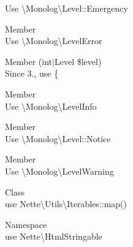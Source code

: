 \begin{DoxyRefList}
\label{deprecated__deprecated000125}%
%
Use \textbackslash{}\+Monolog\textbackslash{}\+Level\+::\+Emergency  
\item[Member \doxylink{class_monolog_1_1_logger_a49efb7c5d80f3d4d1546628ed3d7753e}{Monolog\textbackslash{}Logger\+::ERROR} ]\hfill \\
\label{deprecated__deprecated000122}%
%
Use \textbackslash{}\+Monolog\textbackslash{}\+LevelError  
\item[Member \doxylink{class_monolog_1_1_logger_a9f836823f9dd8789d6d2d80ef84a0a00}{Monolog\textbackslash{}Logger\+::get\+Level\+Name} (int\texorpdfstring{$\vert$}{|}\+Level \$level)]\hfill \\
\label{deprecated__deprecated000126}%
%
Since 3., use \{ 
\item[Member \doxylink{class_monolog_1_1_logger_abc97a22650dfd188c44f4eedd74f90c4}{Monolog\textbackslash{}Logger\+::INFO} ]\hfill \\
\label{deprecated__deprecated000119}%
%
Use \textbackslash{}\+Monolog\textbackslash{}\+LevelInfo  
\item[Member \doxylink{class_monolog_1_1_logger_af42abdf8b3a233980b62cfba1a093bbf}{Monolog\textbackslash{}Logger\+::NOTICE} ]\hfill \\
\label{deprecated__deprecated000120}%
%
Use \textbackslash{}\+Monolog\textbackslash{}\+Level\+::\+Notice  
\item[Member \doxylink{class_monolog_1_1_logger_aa7f7b657ebaef94d93c93ff472556431}{Monolog\textbackslash{}Logger\+::WARNING} ]\hfill \\
\label{deprecated__deprecated000121}%
%
Use \textbackslash{}\+Monolog\textbackslash{}\+LevelWarning  
\item[Class \doxylink{class_nette_1_1_iterators_1_1_mapper}{Nette\textbackslash{}Iterators\textbackslash{}Mapper} ]\hfill \\
\label{deprecated__deprecated000173}%
%
use Nette\textbackslash{}\+Utils\textbackslash{}\+Iterables\+::map()  
\item[Namespace \doxylink{namespace_nette_1_1_localization}{Nette\textbackslash{}Localization} ]\hfill \\
\label{deprecated__deprecated000171}%
%
use Nette\textbackslash{}\+Html\+Stringable  

\end{DoxyRefList}
